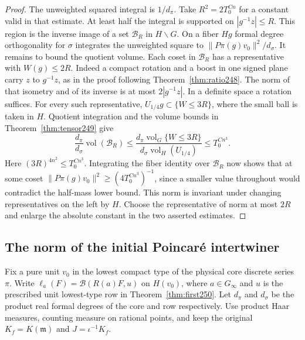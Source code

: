 \documentclass[a4paper,11pt]{article}
\theoremstyle{definition}
\theoremstyle{remark}
\numberwithin{equation}{section}
\begin{document}
\begin{proof}
The unweighted squared integral is \(1/d_\pi\). Take \(R^2=2T_0^{C n}\)
for a constant valid in that estimate. At least half the integral is
supported on \(|g^{-1}z|\le R\). This region is the inverse image
of a set \(\mathcal B_R\) in \(H\backslash G\). On a fiber \(Hg\)
formal degree orthogonality for \(\sigma\) integrates the unweighted
square to \(\|P\pi(g)v_0\|^2/d_\sigma\). It remains to bound the
quotient volume. Each coset in \(\mathcal B_R\) has a representative
with \(W(g)\le2R\). Indeed a compact rotation and a boost in one
signed plane carry \(z\) to \(g^{-1}z\), as in the proof following
Theorem~\ref{thm:ratio248}. The norm of that isometry and of its inverse
is at most \(2|g^{-1}z|\). In a definite space a rotation suffices.
For every such representative, \(U_{1/4}g\subset\{W\le3R\}\), where
the small ball is taken in \(H\). Quotient integration and the volume
bounds in Theorem~\ref{thm:tensor249} give
\[
 \frac{d_\pi}{d_\sigma}\operatorname{vol}(\mathcal B_R)
 \le\frac{d_\pi\operatorname{vol}_G\{W\le3R\}}
           {d_\sigma\operatorname{vol}_H(U_{1/4})}
 \le T_0^{C n^3} .
\]
Here \((3R)^{4n^2}\le T_0^{C n^3}\). Integrating the fiber identity
over \(\mathcal B_R\) now shows that at some coset
\(\|P\pi(g)v_0\|^2\ge (4T_0^{C n^3})^{-1}\), since a smaller
value throughout would contradict the half-mass lower bound. This
norm is invariant under changing representatives on the left by \(H\).
Choose the representative of norm at most \(2R\) and enlarge the absolute
constant in the two asserted estimates.
\end{proof}

\subsection{The norm of the initial Poincar\'e intertwiner}\label{nav:IV-37}
Fix a pure unit \(v_0\) in the lowest compact type of the physical
core discrete series \(\pi\). Write
\(\ell_a(F)=\mathcal B(R(a)F,u)\) on \(H(v_0)\), where
\(a\in G_\infty\) and \(u\) is the prescribed unit
lowest-type row in Theorem~\ref{thm:first250}. Let \(d_\pi\)
and \(d_\sigma\) be the product real formal degrees of the
core and row respectively. Use product Haar measures, counting
measure on rational points, and keep the original
\(K_f=K(\mathfrak m)\) and \(J=\iota^{-1}K_f\).
\end{document}
